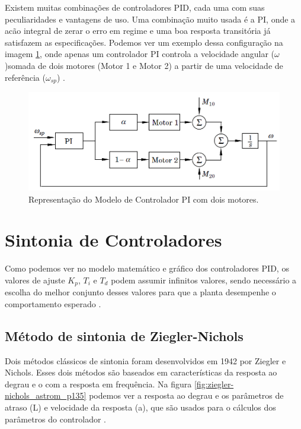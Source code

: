 Existem muitas combinações de controladores PID, cada uma com suas peculiaridades e vantagens de uso. Uma combinação muito usada é a PI, onde a acão integral de zerar o erro em regime e uma boa resposta transitória já satisfazem as especificações. Podemos ver um exemplo dessa configuração na imagem \ref{fig:pi_twomotors_astrom_p308}, onde apenas um controlador PI controla a velocidade angular (\textit{$\omega$})somada de dois motores (Motor 1 e Motor 2) a partir de uma velocidade de referência (\textit{$\omega_{sp}$}) \cite{Astrom1995}.

\begin{figure}[!ht]
  \caption{Representação do Modelo de Controlador PI com dois motores.}
  \begin{center}
      \includegraphics[scale=0.65]{img/pi_twomotors_astrom_p308}
  \end{center}
  \label{fig:pi_twomotors_astrom_p308}
\end{figure}



\section{Sintonia de Controladores}

Como podemos ver no modelo matemático e gráfico dos controladores PID, os valores de ajuste $K_p$, $T_i$ e $T_d$  podem assumir infinitos valores, sendo necessário a escolha do melhor conjunto desses valores para que a planta desempenhe o comportamento esperado \cite{Ogata}.



\subsection{Método de sintonia de Ziegler-Nichols}

Dois métodos clássicos de sintonia foram desenvolvidos em 1942 por Ziegler e Nichols. Esses dois métodos são baseados em características da resposta ao degrau e o com a resposta em frequência. Na figura \ref{fig:ziegler-nichols_astrom_p135} podemos ver a resposta ao degrau e os parâmetros de atraso (L) e velocidade da resposta (a), que são usados para o cálculos dos parâmetros do controlador  \cite{Astrom1995}. 

